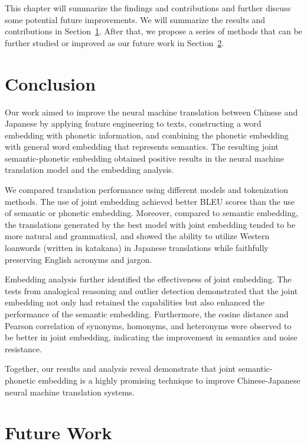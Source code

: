 \hspace{24pt}

This chapter will summarize the findings and contributions and further discuss some potential future improvements.  We will summarize the results and contributions in Section~\ref{sec:conclusion}. After that, we propose a series of methods that can be further studied or improved as our future work in Section~\ref{sec:future_work}.

\section{Conclusion} \label{sec:conclusion}

Our work aimed to improve the neural machine translation between Chinese and Japanese by applying feature engineering to texts, constructing a word embedding with phonetic information, and combining the phonetic embedding with general word embedding that represents semantics. The resulting joint semantic-phonetic embedding obtained positive results in the neural machine translation model and the embedding analysis. 

We compared translation performance using different models and tokenization methods. The use of joint embedding achieved better BLEU scores than the use of semantic or phonetic embedding. Moreover, compared to semantic embedding, the translations generated by the best model with joint embedding tended to be more natural and grammatical, and showed the ability to utilize Western loanwords (written in katakana) in Japanese translations while faithfully preserving English acronyms and jargon.

Embedding analysis further identified the effectiveness of joint embedding. The tests from analogical reasoning and outlier detection demonstrated that the joint embedding not only had retained the capabilities but also enhanced the performance of the semantic embedding. Furthermore, the cosine distance and Pearson correlation of synonyms, homonyms, and heteronyms were observed to be better in joint embedding, indicating the improvement in semantics and noise resistance.

Together, our results and analysis reveal demonstrate that joint semantic-phonetic embedding is a highly promising technique to improve Chinese-Japanese neural machine translation systems.

\section{Future Work} \label{sec:future_work}


